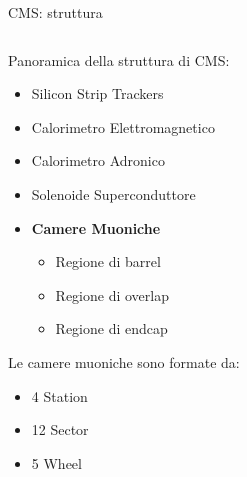 \documentclass{beamer}
\begin{document}
\begin{frame}{CMS: struttura}

\begin{columns}
    \begin{column}{0.5\textwidth}
        Panoramica della struttura di CMS:
        \begin{itemize}
            \item Silicon Strip Trackers
            \item Calorimetro Elettromagnetico
            \item Calorimetro Adronico 
            \item Solenoide Superconduttore 
            \item \textbf{Camere Muoniche}
                \begin{itemize}
                    \item Regione di barrel
                    \item Regione di overlap
                    \item Regione di endcap
                \end{itemize}
        \end{itemize}

        Le camere muoniche sono formate da:
        \begin{itemize}
            \item 4 Station
            \item 12 Sector
            \item 5 Wheel
        \end{itemize}
    \end{column}

    \begin{column}{0.5\textwidth}
        \centering
    \end{column}
\end{columns}

\end{frame}
\end{document}
